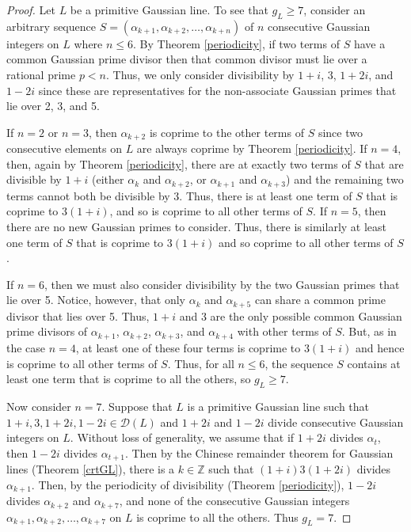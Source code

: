\documentclass[11pt]{article}
\newcommand{\Z}{\mathbb{Z}}
\newcommand{\DL}{{\mathcal{D}}(L)}
\newcommand{\al}{\alpha}
\begin{document}
\begin{proof} Let $L$ be a primitive Gaussian line.  To see that $g_L\geq 7$, consider an arbitrary sequence 
$S=(\alpha_{k+1}, \alpha_{k+2}, \ldots, \alpha_{k+n})$ of $n$ consecutive Gaussian integers on $L$ where $n\leq 6$. 
By Theorem \ref{periodicity}, if two terms of $S$ have a 
common Gaussian prime divisor then that common divisor must lie over a rational prime $p < n$. 
Thus,  we only consider divisibility by $1+i$, $3$, $1+2i$, and $1-2i$ since these are representatives for the non-associate Gaussian primes that lie over 2, 3, and 5.

If $n=2$ or $n=3$, then $\alpha_{k+2}$ is coprime to the other terms of $S$  since two consecutive elements on $L$ are always coprime by Theorem \ref{periodicity}. If $n=4$, then, again by Theorem \ref{periodicity}, there are at exactly two terms of $S$ that are divisible by $1+i$ 
(either $\al_k$ and $\al_{k+2}$, or 
$\al_{k+1}$ and $\al_{k+3}$) and the remaining two terms cannot both be divisible by 3.  Thus, there is at least one term of $S$ that is coprime to  $3(1+i)$, and so is coprime to all  other terms of $S$. If $n=5$, then there are no new Gaussian primes to consider.  Thus, there is similarly  at least one term of $S$  that is coprime to  $3(1+i)$ and so coprime to all other terms of $S$.

If $n=6$, then we must also consider divisibility by the two Gaussian primes that lie over 5. Notice, however, that only $\alpha_{k}$ and $\alpha_{k+5}$ can share a common prime divisor that lies over 5.  Thus, $1+i$ and 3 are the only possible common Gaussian prime divisors of   $\alpha_{k+1}$, 
$\alpha_{k+2}$, $\alpha_{k+3}$, and  $\alpha_{k+4}$ with other terms of $S$. But, as in the case $n=4$, at least one of these four terms is coprime to  $3(1+i)$ and hence is coprime to all other terms of $S$. Thus, for all $n\leq 6$, the sequence $S$ contains at least one term that is coprime to all the others, so $g_L\geq 7$.

Now consider $n=7$.  Suppose that $L$ is a primitive Gaussian line such that $1+i, 3, 1+2i,1-2i\in\DL$ and $1+2i$ and $1-2i$ divide consecutive Gaussian integers on $L$.  Without loss of generality, we assume that if $1+2i$ divides $\alpha_t$, then $1-2i$ divides $\alpha_{t+1}$.  Then by the  Chinese remainder theorem for Gaussian lines (Theorem \ref{crtGL}), there is a $k\in\Z$ such that $(1+i)3(1+2i)$ divides 
$\alpha_{k+1}$. Then, by the periodicity of divisibility (Theorem \ref{periodicity}),  $1-2i$ divides $\alpha_{k+2}$ and $\alpha_{k+7}$, and none of the consecutive Gaussian integers $\alpha_{k+1}, \alpha_{k+2}, \ldots, \alpha_{k+7}$ on $L$ is coprime to all the others.  Thus $g_L=7$.


\end{proof}
\end{document}
